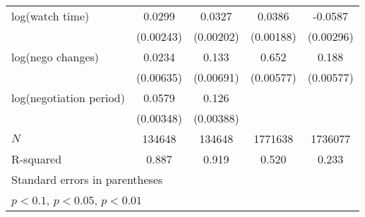 {\begin{adjustbox}{max width=\textwidth}
\begin{tabular}{l*{4}{c}}
\addlinespace
log(watch time)&      0.0299\sym{***}&      0.0327\sym{***}&      0.0386\sym{***}&     -0.0587\sym{***}\\
            &   (0.00243)         &   (0.00202)         &   (0.00188)         &   (0.00296)         \\
\addlinespace
log(nego changes)&      0.0234\sym{***}&       0.133\sym{***}&       0.652\sym{***}&       0.188\sym{***}\\
            &   (0.00635)         &   (0.00691)         &   (0.00577)         &   (0.00577)         \\
\addlinespace
log(negotiation period)&      0.0579\sym{***}&       0.126\sym{***}&                     &                     \\
            &   (0.00348)         &   (0.00388)         &                     &                     \\
\midrule
\(N\)       &      134648         &      134648         &     1771638         &     1736077         \\
R-squared   &       0.887         &       0.919         &       0.520         &       0.233         \\
\bottomrule
\multicolumn{5}{l}{\footnotesize Standard errors in parentheses}\\
\multicolumn{5}{l}{\footnotesize \sym{*} \(p<0.1\), \sym{**} \(p<0.05\), \sym{***} \(p<0.01\)}\\
\end{tabular}
\end{adjustbox}
}
